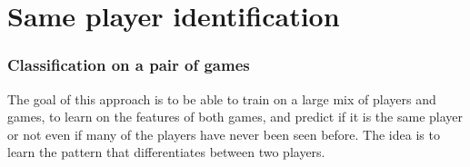 \documentclass[Report.tex]{subfiles}
\begin{document}
\section{Same player identification}\label{sec:pair-classification}


\subsubsection{Classification on a pair of games}
The goal of this approach is to be able to train on a large mix of players and games, to learn on the features of both games, and predict if it is the same player or not even if many of the players have never been seen before. The idea is to learn the pattern that differentiates between two players. 
\end{document}
